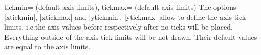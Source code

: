 \begin{pgfplotsxykeylist}{%
    \x tickmin= (default axis limits),
    \x tickmax= (default axis limits)%
}
\label{key:xytickminmax}
    The options |xtickmin|, |xtickmax| and |ytickmin|, |ytickmax| allow to
    define the axis tick limits, i.e.\@ the axis values before respectively
    after no ticks will be placed. Everything outside of the axis tick limits
    will be not drawn. Their default values are equal to the axis limits.
\begin{codeexample}[]
\end{codeexample}
\end{pgfplotsxykeylist}

